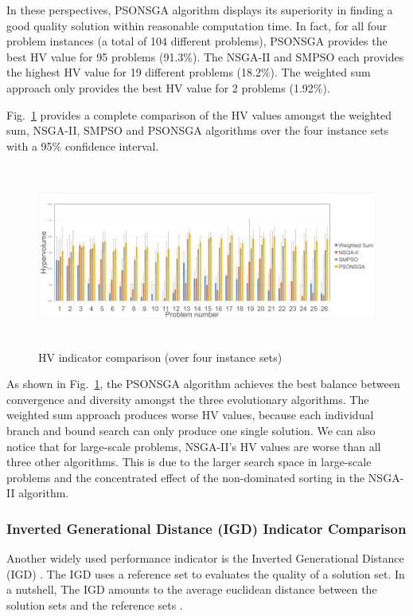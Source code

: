 \documentclass[10pt,journal,compsoc]{IEEEtran}
\newcommand{\Fig}[1]{Fig.~\ref{#1}}
\begin{document}
In these perspectives, PSONSGA algorithm displays its superiority in finding a good quality solution within reasonable computation time. In fact, for all four problem instances (a total of 104 different problems), PSONSGA provides the best HV value for 95 problems (91.3\%). The NSGA-II and SMPSO each provides the highest HV value for 19 different problems (18.2\%). The weighted sum approach only provides the best HV value for 2 problems (1.92\%).

\Fig{hvaverage} provides a complete comparison of the HV values amongst the weighted sum, NSGA-II, SMPSO and PSONSGA algorithms over the four instance sets with a 95\% confidence interval.
\begin{figure}[ht]
\centerline{\includegraphics[page=1,width=\textwidth, height= 6cm]{hvaverageoverfour.png}}
\caption{HV indicator comparison (over four instance sets)} 
\label{hvaverage}
\end{figure}

As shown in \Fig{hvaverage}, the PSONSGA algorithm achieves the best balance between convergence and diversity amongst the three evolutionary algorithms. The weighted sum approach produces worse HV values, because each individual branch and bound search can only produce one single solution. We can also notice that for large-scale problems, NSGA-II's HV values are worse than all three other algorithms. This is due to the larger search space in large-scale problems and the concentrated effect of the non-dominated sorting in the NSGA-II algorithm.


\subsubsection{Inverted Generational Distance (IGD) Indicator Comparison}

Another widely used performance indicator is the Inverted Generational Distance (IGD) \cite{sun2018igd}. The IGD uses a reference set to evaluates the quality of a solution set. In a nutshell, The IGD amounts to the average euclidean distance between the solution sets and the reference sets \cite{gaspar2015evolutionary}.
\end{document}
